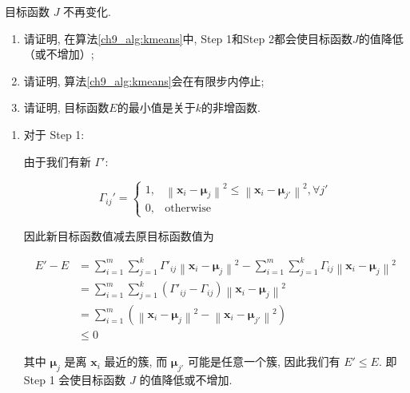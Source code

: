 \documentclass[answers]{exam}  %
\begin{document}
\begin{questions}
{\begin{algorithm}[ht]
\begin{algorithmic}[1]
{        \Until 目标函数 $J$ 不再变化.}
    \end{algorithmic}
  \end{algorithm}}
  \begin{enumerate}
    \item 请证明, 在算法\ref{ch9_alg:kmeans}中, Step 1和Step 2都会使目标函数$J$的值降低（或不增加）;
    \item 请证明, 算法\ref{ch9_alg:kmeans}会在有限步内停止;
    \item 请证明, 目标函数$E$的最小值是关于$k$的非增函数.
  \end{enumerate}


  \begin{solution}
    \begin{enumerate}
      \item

            对于 Step 1:

            由于我们有新 $\Gamma'$:

            $$
              \Gamma_{ij}' = \begin{cases}
                1, & \left\| \bm{x}_{i} - \bm{\mu}_{j} \right\|^{2} \le \left\| \bm{x}_{i} - \bm{\mu}_{j'} \right\|^{2}, \forall j' \\
                0, & \text{otherwise}
              \end{cases}
            $$

            因此新目标函数值减去原目标函数值为

            $$
              \begin{aligned}
                E' - E & = \sum_{i=1}^{m}\sum_{j=1}^{k}\Gamma'_{ij}\left\| \bm{x}_i - \bm{\mu}_j \right\|^{2} - \sum_{i=1}^{m}\sum_{j=1}^{k}\Gamma_{ij}\left\| \bm{x}_i - \bm{\mu}_j \right\|^{2} \\
                       & = \sum_{i=1}^{m}\sum_{j=1}^{k}(\Gamma'_{ij}-\Gamma_{ij})\left\| \bm{x}_i - \bm{\mu}_j \right\|^{2}                                                                       \\
                       & = \sum_{i=1}^{m}(\left\| \bm{x}_i - \bm{\mu}_j \right\|^{2} - \left\| \bm{x}_i - \bm{\mu}_{j'} \right\|^{2})                                                             \\
                       & \le 0
              \end{aligned}
            $$

            其中 $\bm{\mu}_j$ 是离 $\bm{x}_i$ 最近的簇, 而 $\bm{\mu}_{j'}$ 可能是任意一个簇, 因此我们有 $E' \le E$. 即 Step 1 会使目标函数 $J$ 的值降低或不增加.


\end{enumerate}
\end{solution}
\end{questions}
\end{document}
